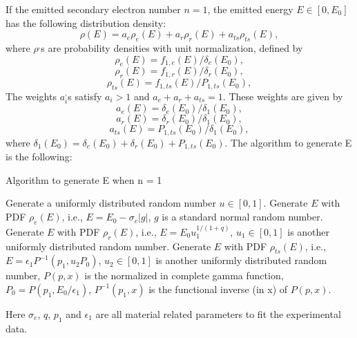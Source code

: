 \documentclass[a4paper,11pt]{article}
\begin{document}
If the emitted secondary electron number $n = 1$, the emitted energy $E \in [0,E_0]$ has the following distribution density:
\begin{equation*}
\rho(E) = a_e\rho_e(E) + a_r\rho_r(E) + a_{ts}\rho_{ts}(E),
\end{equation*}
where $\rho^,$s are probability densities with unit normalization, defined by
\begin{equation*}
\rho_e(E) = f_{1,e}(E)/\delta_e(E_0),
\end{equation*}
\begin{equation*}
\rho_r(E) = f_{1,r}(E)/\delta_r(E_0),
\end{equation*}
\begin{equation*}
\rho_{ts}(E) = f_{1,ts}(E)/P_{1,ts}(E_0),
\end{equation*}
The weights $a_i^,$s satisfy $a_i>1$ and $a_e + a_r + a_{ts} = 1$. These weights are given by
\begin{equation*}
a_{e}(E) = \delta_e(E_0)/\delta_1(E_0),
\end{equation*}
\begin{equation*}
a_{r}(E) = \delta_r(E_0)/\delta_1(E_0),
\end{equation*}
\begin{equation*}
a_{ts}(E) = P_{1,ts}(E_0)/\delta_1(E_0),
\end{equation*}
where $\delta_1(E_0) = \delta_e(E_0) + \delta_r(E_0) + P_{1,ts}(E_0)$. The algorithm to generate E is the following:
\begin{algorithm}[H]
   \caption{Algorithm to generate E when n = 1} \label{alg:ge_algo}
   \begin{algorithmic}[1]
     \STATE Generate a uniformly distributed random number $u \in [0,1]$.
     \STATE Generate $E$ with PDF $\rho_e(E)$, i.e., $E = E_0 - \sigma_e\left| g \right|$, $g$ is a standard normal random number.
     \ENDIF
     \STATE Generate $E$ with PDF $\rho_r(E)$, i.e., $E = E_0u_1^{1/(1+q)}$, $u_1 \in [0,1]$ is another uniformly distributed random number.
     \ENDIF
     \STATE Generate $E$ with PDF $\rho_{ts}(E)$, i.e., $E = \epsilon_1P^{-1}(p_1,u_2P_0)$, $u_2 \in [0,1]$ is another uniformly distributed random number, $P(p,x)$ is the normalized in complete gamma function, $P_0 = P(p_1,E_0/\epsilon_1)$, $P^{-1}(p_1,x)$ is the functional inverse (in x) of $P(p,x)$.
     \ENDIF
   \end{algorithmic}
 \end{algorithm}
Here $\sigma_e$, $q$, $p_1$ and $\epsilon_1$ are all material related parameters to fit the experimental data.\\
\end{document}
